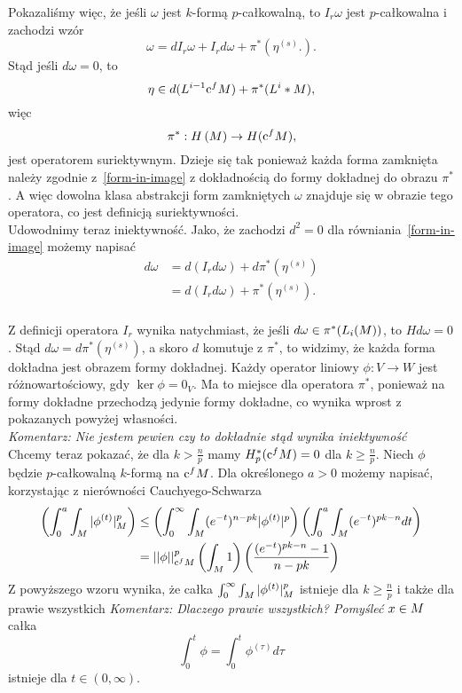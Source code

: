 \documentclass[licencjacka]{pracamgr}
\theoremstyle{definition}
\theoremstyle{definition}
\theoremstyle{plain}
\theoremstyle{plain}
\theoremstyle{plain}
\theoremstyle{plain}
\def\cfm{\ensuremath\mathrm{c}^fM}
\def\M{\ensuremath M}
\begin{document}
Pokazaliśmy więc, że jeśli $\omega$ jest $k$-formą $p$-całkowalną, to  $I_r \omega$ jest
$p$-całkowalna i zachodzi wzór
\[
    \omega = dI_r \omega + I_r d \omega + \pi^\ast 
    \left(
        \eta^{(s)}.
    \right).
\]
Stąd jeśli $d \omega = 0$, to 
\[\label{form-in-image}
    \eta \in d(L^{i-1} \cfm) + \pi^\ast (L^i*\M),
\]
więc 
\[
    \pi^\ast: H \left( \M \right) \rightarrow H ( \cfm ),
\]
jest operatorem suriektywnym. Dzieje się tak ponieważ każda forma zamknięta
należy zgodnie z~\ref{form-in-image} z dokładnością do formy dokładnej do
obrazu $\pi^\ast$. A więc dowolna klasa abstrakcji form zamkniętych $\omega$
znajduje się w obrazie tego operatora, co jest definicją suriektywności. \\

Udowodnimy teraz iniektywność.
Jako, że zachodzi $d^2 = 0$ dla równiania~\ref{form-in-image}
możemy napisać
\begin{align*}
d \omega &= d(I_rd\omega) + d\pi^\ast( \eta^{(s)}) \\
         &= d(I_rd\omega) + \pi^\ast( \eta^{(s)}). \\
\end{align*}

Z definicji operatora $I_r$ wynika natychmiast, że jeśli
 $d \omega \in \pi^\ast(L_i(\M))$, to $Hd\omega = 0$.
Stąd $d \omega = d \pi^\ast(\eta^{(s)})$, a skoro $d$ komutuje z $\pi^\ast$,
to widzimy, że każda forma dokładna jest obrazem formy dokładnej. 
Każdy operator liniowy $\phi: V \rightarrow W$ jest różnowartościowy, gdy
$\ker \phi = 0_V$. Ma to miejsce dla operatora $\pi^\ast$, ponieważ
na formy dokładne przechodzą jedynie formy dokładne, co wynika wprost z pokazanych
powyżej własności. \\

\emph{Komentarz: Nie jestem pewien czy to dokładnie stąd wynika iniektywność} \\

Chcemy teraz pokazać, że dla $k > \frac{n}{p}$ mamy $H^\ast_p(\cfm) = 0$ dla
$k \geq \frac{n}{p}$. Niech $\phi$ będzie $p$-całkowalną $k$-formą na
$\cfm$. Dla określonego $a > 0$ możemy napisać, korzystając z nierówności
Cauchyego-Schwarza
\begin{align*}
\left(
    \int_0^a \int_\M |\phi^{(t)}|_M^p
\right) & \leq 
\left(
    \int_0^\infty \int_\M (e^{-t})^{n-pk} |\phi^{(t)}|^p
\right)
\left(
    \int_0^a \int_\M (e^{-t})^{pk-n} dt 
\right) \\
&= 
    ||\phi||_{\cfm}^p 
\left(
    \int_\M 1
\right)
\left(
    \frac{ (e^{-t})^{pk-n} - 1 }{n-pk}
\right) \\
\end{align*}
Z powyższego wzoru wynika, że całka $\int_0^\infty \int_\M |\phi^{(t)}|_M^p$ 
istnieje dla $k \geq \frac{n}{p}$ i także dla prawie wszystkich
\emph{Komentarz: Dlaczego prawie wszystkich? Pomyśleć}
$x \in \M$ całka
\[
\int_0^t \phi = \int_0^t \phi^{(\tau)} d\tau
\]
istnieje dla $t \in (0, \infty)$. \\
\end{document}
